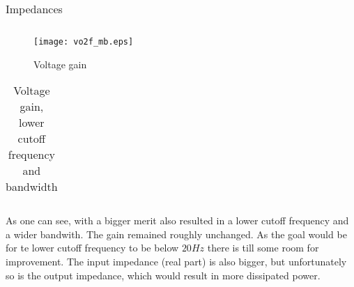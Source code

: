 \begin{table}[H]
  \centering
  \begin{tabular}{|c|c|}
    \hline
        
        \hline
  \end{tabular}
  \caption{Impedances}
  \label{tab:sim_imp_mb}
\end{table}

\begin{figure}[H]
\centering
\texttt{[image: vo2f\_mb.eps]}
\caption{Voltage gain}
\label{vg_mb}
\end{figure}

\begin{table}[H]
  \centering
  \begin{tabular}{|c|c|}
    \hline
        
        \hline
  \end{tabular}
  \caption{Voltage gain, lower cutoff frequency and bandwidth}
  \label{tab:res_sim_mb}
\end{table}

As one can see, with a bigger merit also resulted in a lower cutoff frequency and a wider bandwith. The gain remained roughly unchanged. As the goal would be for te lower cutoff frequency to be below $20Hz$ there is till some room for improvement. The input impedance (real part) is also bigger, but unfortunately so is the output impedance, which would result in more dissipated power.
